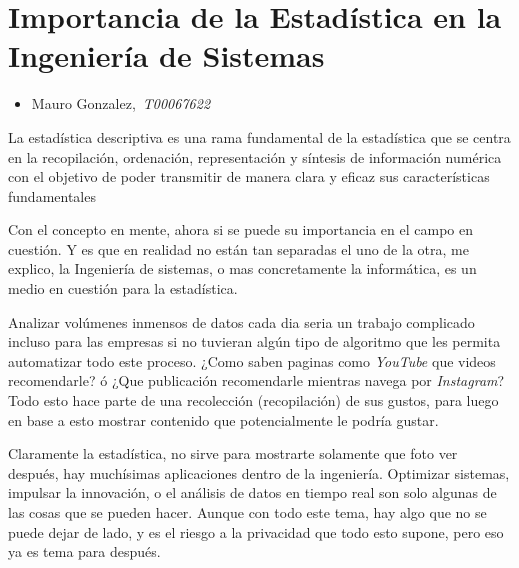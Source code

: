 \documentclass[letterpaper, 12pt]{report}
\begin{document}
\chapter*{Importancia de la Estadística en la Ingeniería de Sistemas}

\noindent\makebox[\linewidth]{\rule{\textwidth}{0.2pt}}

\begin{itemize}
      \item Mauro Gonzalez,~\textit{T00067622}
\end{itemize}

\noindent\makebox[\linewidth]{\rule{\textwidth}{0.2pt}}

La estadística descriptiva es una rama fundamental de la
estadística que se centra en la recopilación, ordenación,
representación y síntesis de información numérica con el
objetivo de poder transmitir de manera clara y eficaz sus
características fundamentales~\cite{Rodríguez_2023}

Con el concepto en mente, ahora si se puede su importancia
en el campo en cuestión. Y es que en realidad no están tan
separadas el uno de la otra, me explico, la Ingeniería de
sistemas, o mas concretamente la informática, es un medio
en cuestión para la estadística.

Analizar volúmenes inmensos de datos cada dia seria un
trabajo complicado incluso para las empresas si no tuvieran
algún tipo de algoritmo que les permita automatizar todo
este proceso. ¿Como saben paginas como \textit{YouTube} que
videos recomendarle? ó ¿Que publicación recomendarle
mientras navega por \textit{Instagram}? Todo esto hace
parte de una recolección (recopilación) de sus gustos, para
luego en base a esto mostrar contenido que potencialmente
le podría gustar.

Claramente la estadística, no sirve para mostrarte
solamente que foto ver después, hay muchísimas aplicaciones
dentro de la ingeniería. Optimizar sistemas, impulsar la
innovación, o el análisis de datos en tiempo real son solo
algunas de las cosas que se pueden hacer. Aunque con todo
este tema, hay algo que no se puede dejar de lado, y es el
riesgo a la privacidad que todo esto supone, pero eso ya es
tema para después.

\nocite{Jeanluc_2023}
\nocite{Cutipa_2023}

\printbibliography
\end{document}
